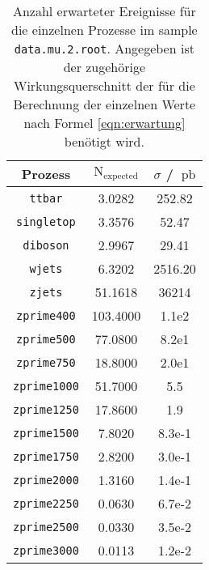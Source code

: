 \begin{table}
    \centering
    \caption{Anzahl erwarteter Ereignisse für die einzelnen Prozesse im sample \texttt{data.mu.2.root}. Angegeben 
    ist der zugehörige Wirkungsquerschnitt der für die Berechnung der einzelnen Werte nach Formel 
    \eqref{eqn:erwartung} benötigt wird.}
    \label{tab:Erwartungen}
    \begin{tabular}{c|cc}
    \toprule 
    Prozess & $\text{N}_\text{expected}$ & $\sigma$ / $\SI{}{\pico\barn}$ \\
    \midrule
    \texttt{ttbar}      &  3.0282   & 252.82    \\
    \texttt{singletop}  &  3.3576   & 52.47     \\
    \texttt{diboson}    &  2.9967   & 29.41     \\
    \texttt{wjets}      &  6.3202   & 2516.20   \\
    \texttt{zjets}      &  51.1618  & 36214     \\
    \texttt{zprime400}  &  103.4000 & 1.1e2     \\
    \texttt{zprime500}  &  77.0800  & 8.2e1     \\
    \texttt{zprime750}  &  18.8000  & 2.0e1     \\
    \texttt{zprime1000} &  51.7000  & 5.5       \\
    \texttt{zprime1250} &  17.8600  & 1.9       \\
    \texttt{zprime1500} &  7.8020   & 8.3e-1    \\
    \texttt{zprime1750} &  2.8200   & 3.0e-1    \\
    \texttt{zprime2000} &  1.3160   & 1.4e-1    \\
    \texttt{zprime2250} &  0.0630   & 6.7e-2    \\
    \texttt{zprime2500} &  0.0330   & 3.5e-2    \\
    \texttt{zprime3000} &  0.0113   & 1.2e-2    \\
    \bottomrule 
    \end{tabular}
\end{table}



